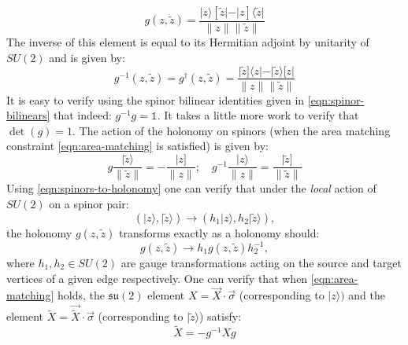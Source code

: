 \documentclass[twocolumn,draft,aps,nofootinbib,nobibnotes,final]{revtex4-2}
\newcommand{\mf}[1]{\mathfrak{#1}}
\newcommand{\id}{\mathbb{1}}
\newcommand{\bra}[1]{\langle #1 \vert}
\newcommand{\ket}[1]{\vert #1 \rangle}
\newcommand{\norm}[1]{\lVert #1 \rVert}
\newcommand{\rket}[1]{\vert #1 ]}
\newcommand{\rbra}[1]{[ #1 \vert}
\begin{document}
\begin{equation}
	g(z,\tilde z) = \frac{\ket{z}\rbra{\tilde z} - \rket{z}\bra{\tilde z}}{\norm{z} \norm{\tilde z}}
\end{equation}
The inverse of this element is equal to its Hermitian adjoint by unitarity of $ SU(2) $ and is given by:
\begin{equation}\label{eqn:holonomy-inverse}
	g^{-1}(z, \tilde z) = g^\dag(z, \tilde z) = \frac{\rket{\tilde z}\bra{z} - \ket{\tilde z}\rbra{z}}{\norm{z} \norm{\tilde z}}
\end{equation}
It is easy to verify using the spinor bilinear identities given in \eqref{eqn:spinor-bilinears} that indeed: $ g^{-1} g = \id $. It takes a little more work to verify that $ \det(g) = 1 $. The action of the holonomy on spinors (when the area matching constraint \eqref{eqn:area-matching} is satisfied) is given by:
\begin{equation}\label{eqn:holonomy-action}
	g \frac{\ket{\tilde z}}{\norm{\tilde z}} = -\frac{\rket{z}}{\norm{z}}; \quad g^{-1} \frac{\ket{z}}{\norm{z}} = \frac{\rket{\tilde z}}{\norm{\tilde z}}
\end{equation}
Using \eqref{eqn:spinors-to-holonomy} one can verify that under the \textit{local} action of $ SU(2) $ on a spinor pair:
\begin{equation}\label{eqn:su2-spinor-action}
	(\ket{z}, \ket{\tilde z}) \rightarrow (h_1 \ket{z}, h_2 \ket{\tilde z}),
\end{equation}
the holonomy $ g(z, \tilde z) $ transforms exactly as a holonomy should:
\begin{equation}\label{eqn:su2-holonomy-action}
	g(z, \tilde z) \rightarrow h_1 g(z, \tilde z) h_2^{-1},
\end{equation}
where $ h_1, h_2 \in SU(2) $ are gauge transformations acting on the source and target vertices of a given edge respectively. One can verify that when \eqref{eqn:area-matching} holds, the $ \mf{su}(2) $ element $ X = \vec{X}\cdot\vec{\sigma} $ (corresponding to $ \ket{z}) $ and the element $ \tilde{X} = \vec{\tilde X}\cdot\vec{\sigma} $ (corresponding to $ \ket{\tilde z} $) satisfy:
\begin{equation}\label{eqn:3-vecs-relation}
	\tilde X = -g^{-1} X g
\end{equation}
\end{document}
